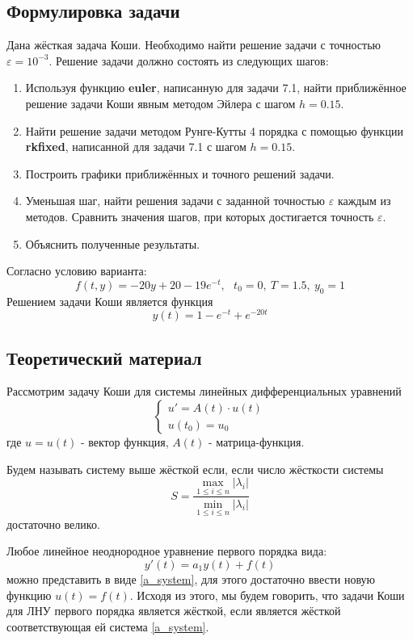 \documentclass[12pt]{article}%
\begin{document}
\subsection{Формулировка задачи}
Дана жёсткая задача Коши. Необходимо найти решение задачи с точностью $\varepsilon = 10^{-3}$.
Решение задачи должно состоять из следующих шагов:
\begin{enumerate}
    \item Используя функцию \textbf{euler}, написанную для задачи 7.1, найти приближённое решение задачи Коши явным методом Эйлера с шагом $h=0.15$. 
    \item Найти решение задачи методом Рунге-Кутты 4 порядка с помощью функции \textbf{rkfixed}, написанной для задачи 7.1 с шагом $h=0.15$.
    \item Построить графики приближённых и точного решений задачи.
    \item Уменьшая шаг, найти решения задачи с заданной точностью $\varepsilon$ каждым из методов. Сравнить значения шагов, при которых достигается точность $\varepsilon$.
    \item Объяснить полученные результаты.
\end{enumerate}
Согласно условию варианта:
$$
f(t, y) = -20y + 20 - 19 e^{-t}, \ \ \ t_0 = 0,\ T=1.5,\ y_0=1
$$
Решением задачи Коши является функция
$$
y(t) = 1 - e^{-t} + e^{-20t}
$$

\subsection{Теоретический материал}
Рассмотрим задачу Коши для системы линейных дифференциальных уравнений
\begin{equation}\label{a_system}
\begin{cases}
    u' = A(t) \cdot u(t) \\
    u(t_0) = u_0
\end{cases}
\end{equation}
где $u = u(t)$ - вектор функция, $A(t)$ - матрица-функция.

Будем называть систему выше жёсткой если, если число жёсткости системы
\begin{equation}
    S = \frac{
    \max\limits_{1 \leqslant i \leqslant n}|\lambda_i|}{
    \min\limits_{1 \leqslant i \leqslant n}|\lambda_i|}
\end{equation}
достаточно велико.


Любое линейное неоднородное уравнение первого порядка вида:
$$
y'(t) = a_1 y(t) + f(t)
$$
можно представить в виде \ref{a_system}, для этого достаточно ввести новую функцию $u(t) = f(t)$. Исходя из этого, мы будем говорить, что задачи Коши для ЛНУ первого порядка является жёсткой, если является жёсткой соответствующая ей система \ref{a_system}.
\end{document}
